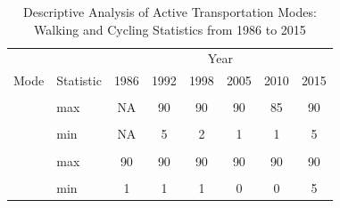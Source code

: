 \documentclass[
11pt, %
oneside, %
english, %
singlespacing, %
]{macthesis} %
\begin{document}
\begin{longtable}[t]{>{}llcccccc}
\caption{\label{tab:unnamed-chunk-14}\label{tab:table_13}Descriptive Analysis of Active Transportation Modes: Walking and Cycling Statistics from 1986 to 2015}\\
\toprule
\multicolumn{2}{c}{ } & \multicolumn{6}{c}{Year} \\
\cmidrule(l{3pt}r{3pt}){3-8}
Mode & Statistic & 1986 & 1992 & 1998 & 2005 & 2010 & 2015\\
\midrule
\textbf{\cellcolor{gray!10}{cycling}} & \cellcolor{gray!10}{Count} & \cellcolor{gray!10}{NA} & \cellcolor{gray!10}{126} & \cellcolor{gray!10}{119} & \cellcolor{gray!10}{330} & \cellcolor{gray!10}{230} & \cellcolor{gray!10}{240}\\
\cmidrule{1-8}\pagebreak[0]
\textbf{} & max & NA & 90 & 90 & 90 & 85 & 90\\
\cmidrule{1-8}\pagebreak[0]
\textbf{\cellcolor{gray!10}{}} & \cellcolor{gray!10}{mean} & \cellcolor{gray!10}{NA} & \cellcolor{gray!10}{24} & \cellcolor{gray!10}{21} & \cellcolor{gray!10}{18} & \cellcolor{gray!10}{18} & \cellcolor{gray!10}{22}\\
\cmidrule{1-8}\pagebreak[0]
\textbf{} & min & NA & 5 & 2 & 1 & 1 & 5\\
\cmidrule{1-8}\pagebreak[0]
\textbf{\cellcolor{gray!10}{NA}} & \cellcolor{gray!10}{Count} & \cellcolor{gray!10}{4229} & \cellcolor{gray!10}{1473} & \cellcolor{gray!10}{1657} & \cellcolor{gray!10}{5517} & \cellcolor{gray!10}{4360} & \cellcolor{gray!10}{3217}\\
\cmidrule{1-8}\pagebreak[0]
\textbf{} & max & 90 & 90 & 90 & 90 & 90 & 90\\
\cmidrule{1-8}\pagebreak[0]
\textbf{\cellcolor{gray!10}{}} & \cellcolor{gray!10}{mean} & \cellcolor{gray!10}{17} & \cellcolor{gray!10}{17} & \cellcolor{gray!10}{10} & \cellcolor{gray!10}{12} & \cellcolor{gray!10}{12} & \cellcolor{gray!10}{16}\\
\cmidrule{1-8}\pagebreak[0]
\textbf{} & min & 1 & 1 & 1 & 0 & 0 & 5\\
\bottomrule
\end{longtable}
\endgroup{}
\end{document}
